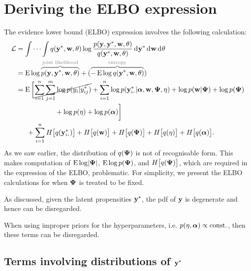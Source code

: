 \section{Deriving the ELBO expression}

The evidence lower bound (ELBO) expression involves the following calculation:
\begin{align*}
  \cL &= \idotsint q(\by^*,\bw,\theta) 
  \log \frac{p(\by,\by^*,\bw,\theta)}{q(\by^*,\bw,\theta)}
  \dint\by^* \dint\bw \dint\theta \\
  &= \E \log \greyoverbrace{p(\by,\by^*,\bw,\theta)}{\text{joint likelihood}}
  +
  (\greyoverbrace{-\E \log q(\by^*,\bw,\theta)}{\text{entropy}}) \\
  &= \E\bigg[
  \cancel{\sum_{i=1}^n \sum_{j=1}^m \log  p(y_{i}|y_{ij}^*)} + 
  \sum_{i=1}^n \log  p(\by_{i \bigcdot}^*|\balpha,\bw,\bPsi,\eta) +
  \log p(\bw|\bPsi) +
  \log p(\bPsi) \\ 
  &\hspace{2cm} +
  \log p(\eta) +
  \log p(\balpha)
  \bigg] \\
  &\phantom{==} 
  + \sum_{i=1}^n H\big[q(\by^*_{i \bigcdot}) \big]
  + H\big[q(\bw) \big]
  + H\big[q(\bPsi) \big]
  + H\big[q(\eta) \big]
  + H\big[q(\balpha) \big].
\end{align*}
As we saw earlier, the distribution of $q({\bm\Psi})$ is not of recognisable form. 
This makes computation of $\operatorname{E} \log \lvert{\bm\Psi}\rvert$, $\operatorname{E} \log p({\bm\Psi})$, and $H\big[q({\bm\Psi})\big]$, which are required in the expression of the ELBO, problematic.
For simplicity, we present the ELBO calculations for when ${\bm\Psi}$ is treated to be fixed.

\begin{remark}
  As discussed, given the latent propensities ${\mathbf y}^*$, the pdf of ${\mathbf y}$ is degenerate and hence can be disregarded.  
\end{remark}

\begin{remark}
  When using improper priors for the hyperparameters, i.e. $p(\eta,{\bm\alpha}) \propto \text{const.}\hspace{0.01em}$, then these terms can be disregarded.  
\end{remark}

\subsection{Terms involving distributions of \texorpdfstring{${\mathbf y}^*$}{$y^*$}}

